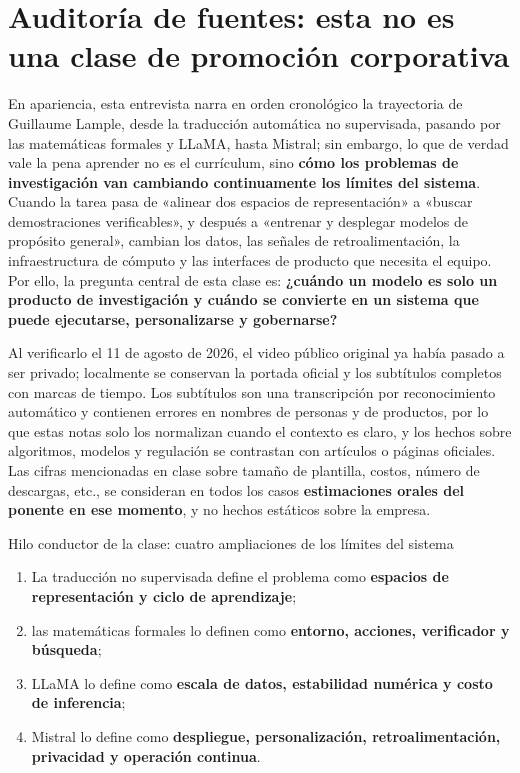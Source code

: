 \documentclass[a4paper]{article}
\begin{document}
\makecscover

\section{Auditoría de fuentes: esta no es una clase de promoción corporativa}

En apariencia, esta entrevista narra en orden cronológico la trayectoria de Guillaume Lample, desde la traducción automática no supervisada, pasando por las matemáticas formales y LLaMA, hasta Mistral; sin embargo, lo que de verdad vale la pena aprender no es el currículum, sino \textbf{cómo los problemas de investigación van cambiando continuamente los límites del sistema}. Cuando la tarea pasa de «alinear dos espacios de representación» a «buscar demostraciones verificables», y después a «entrenar y desplegar modelos de propósito general», cambian los datos, las señales de retroalimentación, la infraestructura de cómputo y las interfaces de producto que necesita el equipo. Por ello, la pregunta central de esta clase es: \textbf{¿cuándo un modelo es solo un producto de investigación y cuándo se convierte en un sistema que puede ejecutarse, personalizarse y gobernarse?}

Al verificarlo el 11 de agosto de 2026, el video público original ya había pasado a ser privado; localmente se conservan la portada oficial y los subtítulos completos con marcas de tiempo. Los subtítulos son una transcripción por reconocimiento automático y contienen errores en nombres de personas y de productos, por lo que estas notas solo los normalizan cuando el contexto es claro, y los hechos sobre algoritmos, modelos y regulación se contrastan con artículos o páginas oficiales. Las cifras mencionadas en clase sobre tamaño de plantilla, costos, número de descargas, etc., se consideran en todos los casos \textbf{estimaciones orales del ponente en ese momento}, y no hechos estáticos sobre la empresa.

\begin{importantbox}{Hilo conductor de la clase: cuatro ampliaciones de los límites del sistema}
\begin{enumerate}
  \item La traducción no supervisada define el problema como \textbf{espacios de representación y ciclo de aprendizaje};
  \item las matemáticas formales lo definen como \textbf{entorno, acciones, verificador y búsqueda};
  \item LLaMA lo define como \textbf{escala de datos, estabilidad numérica y costo de inferencia};
  \item Mistral lo define como \textbf{despliegue, personalización, retroalimentación, privacidad y operación continua}.
\end{enumerate}
\end{importantbox}
\end{document}
